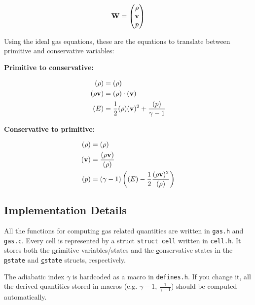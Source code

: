 \begin{align}
	\mathbf{W} = 
		\begin{pmatrix}
			\rho \\ \mathbf{v} \\ p
		\end{pmatrix}
\end{align}



Using the ideal gas equations, these are the equations to translate between primitive and conservative variables:

\textbf{Primitive to conservative:}

\begin{align}
	(\rho) &= (\rho) \\
	(\rho \mathbf{v}) &= (\rho) \cdot (\mathbf{v}) \\
	(E) &= \frac{1}{2} (\rho) (\mathbf{v})^2 + \frac{(p)}{\gamma - 1} 
\end{align}


\textbf{Conservative to primitive:}

\begin{align}
	(\rho) &= (\rho) \\
	(\mathbf{v}) &= \frac{(\rho \mathbf{v} )}{(\rho)}\\
	(p) &= (\gamma - 1)  \left((E) - \frac{1}{2} \frac{(\rho \mathbf{v})^2}{(\rho)} \right) 
\end{align}













\subsection{Implementation Details}

All the functions for computing gas related quantities are written in \verb|gas.h| and \verb|gas.c|.
Every cell is represented by a struct \verb|struct cell| written in \verb|cell.h|.
It stores both the \underline{p}rimitive variables/states and the \underline{c}onservative states in the \texttt{\underline{p}state} and \texttt{\underline{c}state} structs, respectively.

The adiabatic index $\gamma$ is hardcoded as a macro in \texttt{defines.h}.
If you change it, all the derived quantities stored in macros (e.g. $\gamma - 1$, $\frac{1}{\gamma - 1}$) should be computed automatically.

